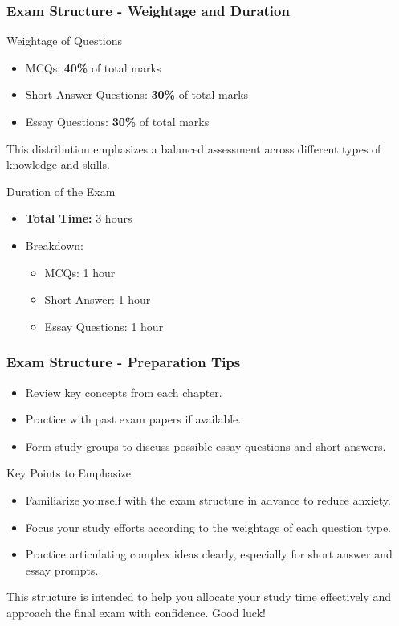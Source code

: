 \documentclass{beamer}
\begin{document}
\begin{frame}[fragile]
    \frametitle{Exam Structure - Weightage and Duration}
    \begin{block}{Weightage of Questions}
        \begin{itemize}
            \item MCQs: \textbf{40\%} of total marks
            \item Short Answer Questions: \textbf{30\%} of total marks
            \item Essay Questions: \textbf{30\%} of total marks
        \end{itemize}
        This distribution emphasizes a balanced assessment across different types of knowledge and skills.
    \end{block}

    \begin{block}{Duration of the Exam}
        \begin{itemize}
            \item \textbf{Total Time:} 3 hours
            \item Breakdown:
                \begin{itemize}
                    \item MCQs: 1 hour
                    \item Short Answer: 1 hour
                    \item Essay Questions: 1 hour
                \end{itemize}
        \end{itemize}
    \end{block}
\end{frame}

\begin{frame}[fragile]
    \frametitle{Exam Structure - Preparation Tips}
    \begin{itemize}
        \item Review key concepts from each chapter.
        \item Practice with past exam papers if available.
        \item Form study groups to discuss possible essay questions and short answers.
    \end{itemize}

    \begin{block}{Key Points to Emphasize}
        \begin{itemize}
            \item Familiarize yourself with the exam structure in advance to reduce anxiety.
            \item Focus your study efforts according to the weightage of each question type.
            \item Practice articulating complex ideas clearly, especially for short answer and essay prompts.
        \end{itemize}
    \end{block}
    
    This structure is intended to help you allocate your study time effectively and approach the final exam with confidence. Good luck!
\end{frame}
\end{document}
